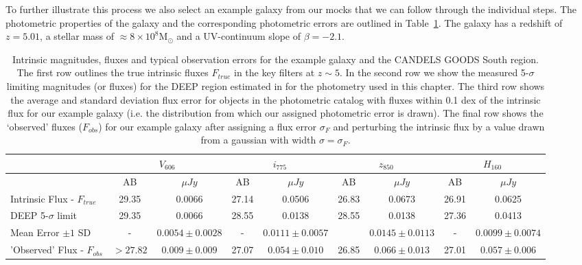 To further illustrate this process we also select an example galaxy from our mocks that we can follow through the individual steps. The photometric properties of the galaxy and the corresponding photometric errors are outlined in Table~\ref{tab:eg_photom}. The galaxy has a redshift of $z = 5.01$, a stellar mass of $\approx 8 \times 10^{8} \text{M}_{\odot}$ and a UV-continuum slope of $\beta = -2.1$.

\begin{landscape}
\begin{table}
    \centering
    \caption[Intrinsic magnitudes, fluxes and typical observation errors for the example galaxy and the CANDELS GOODS South region.]{Intrinsic magnitudes, fluxes and typical observation errors for the example galaxy and the CANDELS GOODS South region. The first row outlines the true intrinsic fluxes $F_{true}$ in the key filters at $z\sim5$. In the second row we show the measured 5-$\sigma$ limiting magnitudes (or fluxes) for the DEEP region estimated in \citet{Guo:2013ig} for the photometry used in this chapter. The third row shows the average and standard deviation flux error for objects in the photometric catalog \citep{Guo:2013ig} with fluxes within 0.1 dex of the intrinsic flux for our example galaxy (i.e. the distribution from which our assigned photometric error is drawn). The final row shows the `observed' fluxes ($F_{obs}$) for our example galaxy after assigning a flux error $\sigma_{F}$ and perturbing the intrinsic flux by a value drawn from a gaussian with width $\sigma = \sigma_{F}$.}
    \begin{tabular}{lcccccccc}
    \hline
    ~                      & \multicolumn{2}{c}{$V_{606}$} & \multicolumn{2}{c}{$i_{775}$} & \multicolumn{2}{c}{$z_{850}$} & \multicolumn{2}{c}{$H_{160}$} \\ \hline
    ~                      & AB        & $\mu Jy$ & AB & $\mu Jy$ & AB & $\mu Jy$ & AB   & $\mu Jy$ \\ \hline
    Intrinsic Flux - $F_{true}$           & 29.35         & 0.0066   & 27.14  & 0.0506  & 26.83  & 0.0673 & 26.91 &  0.0625  \\
    DEEP 5-$\sigma$ limit   & 29.35        & 0.0066   & 28.55  & 0.0138  & 28.55  & 0.0138 & 27.36 &  0.0413   \\
    Mean Error $\pm 1$ SD  & -         & $0.0054\pm0.0028$    & -  & $0.0111 \pm  0.0057$  &   & $0.0145 \pm 0.0113$   &   -   & $0.0099 \pm 0.0074$ \\ 
    'Observed' Flux - $F_{obs}$  & $>27.82$     & $0.009 \pm 0.009$  & 27.07  & $0.054\pm0.010$  & 26.85 & $0.066\pm0.013$   & 27.01        & $0.057 \pm 0.006$   \\
    \hline
    \end{tabular}\label{tab:eg_photom}
\end{table}
\end{landscape}
 
